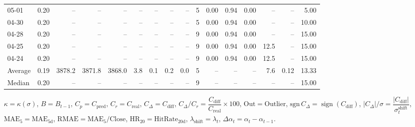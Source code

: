 \begin{threeparttable}
{\begin{tabular}{lrrrrrrrrrrrrrrr}
  05-01 &     0.20 &     -- &     -- &     -- &         -- &             -- &                       -- &                  -- &              5 &       0.00 &      0.94 &           0.00 &               -- &              -- &                   5.00 \\
  04-30 &     0.20 &     -- &     -- &     -- &         -- &             -- &                       -- &                  -- &              5 &       0.00 &      0.94 &           0.00 &               -- &              -- &                  10.00 \\
  04-28 &     0.20 &     -- &     -- &     -- &         -- &             -- &                       -- &                  -- &              9 &       0.00 &      0.94 &           0.00 &               -- &              -- &                  15.00 \\
  04-25 &     0.20 &     -- &     -- &     -- &         -- &             -- &                       -- &                  -- &              9 &       0.00 &      0.94 &           0.00 &             12.5 &              -- &                  15.00 \\
  04-24 &     0.20 &     -- &     -- &     -- &         -- &             -- &                       -- &                  -- &              9 &       0.00 &      0.94 &           0.00 &             12.5 &              -- &                  15.00 \\
Average &     0.19 & 3878.2 & 3871.8 & 3868.0 &        3.8 &            0.1 &                      0.2 &                 0.0 &              5 &         -- &        -- &             -- &              7.6 &            0.12 &                  13.33 \\
 Median &     0.20 &     -- &     -- &     -- &         -- &             -- &                       -- &                  -- &              9 &         -- &        -- &             -- &               -- &              -- &                  15.00 \\
\bottomrule
\end{tabular}
}
\begin{tablenotes}\footnotesize
\item $\kappa=\kappa(\sigma)$, $B=B_{t-1}$, $C_p=C_{\text{pred}}$, $C_r=C_{\text{real}}$, $C_\Delta=C_{\text{diff}}$, $C_\Delta/C_r=\dfrac{C_{\text{diff}}}{C_{\text{real}}}\times100$, $\mathrm{Out}=\text{Outlier}$, $\mathrm{sgn}\,C_\Delta=\operatorname{sign}(C_{\text{diff}})$, $|C_\Delta|/\sigma=\dfrac{|C_{\text{diff}}|}{\sigma_t^{\text{shift}}}$, $\mathrm{MAE}_5=\mathrm{MAE}_{5\text{d}}$, $\mathrm{RMAE}= \mathrm{MAE}_5 / \text{Close}$, $\mathrm{HR}_{20}=\mathrm{HitRate}_{20\text{d}}$, 
$\lambda_{\text{shift}}=\lambda_t$, 
$\Delta\alpha_t=\alpha_t-\alpha_{t-1}$.
\end{tablenotes}
\end{threeparttable}
\endgroup

